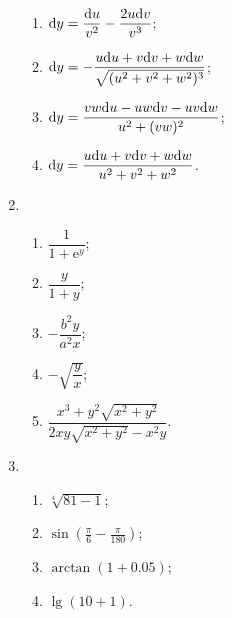 \begin{enumerate}
\begin{enumerate}[(1)]
            \item %
                $\mathrm{d} y = \dfrac{\mathrm{d} u}{v^2} - \dfrac{2u\mathrm{d} v}{v^3}$;
            \item %
                $\mathrm{d} y = -\dfrac{u\mathrm{d} u + v\mathrm{d} v + w\mathrm{d} w}{\sqrt{(u^2 + v^2 + w^2)^3}}$;
            \item %
                $\mathrm{d} y = \dfrac{vw\mathrm{d} u - uw\mathrm{d} v - uv\mathrm{d} w}{u^2 + (vw)^2}$;
            \item %
                $\mathrm{d} y = \dfrac{u\mathrm{d} u + v\mathrm{d} v + w\mathrm{d} w}{u^2 + v^2 + w^2}$.
        \end{enumerate}
    \item %
        \begin{enumerate}[(1)]
            \item %
                $\dfrac{1}{1 + \mathrm{e}^y}$;
            \item %
                $\dfrac{y}{1 + y}$;
            \item %
                $-\dfrac{b^2y}{a^2x}$;
            \item %
                $-\sqrt{\dfrac yx}$;
            \item %
                $\dfrac{x^3 + y^2\sqrt{x^2+y^2}}{2xy\sqrt{x^2+y^2} - x^2y}$.
        \end{enumerate}
    \item %
        \begin{enumerate}[(1)]
            \item %
                $\sqrt[4]{81 - 1}$;
            \item %
                $\displaystyle{
                    \sin\left(\frac{\pi}{6} - \frac{\pi}{180}\right)
                }$;
            \item %
                $\arctan(1 + 0.05)$;
            \item %
                $\lg(10 + 1)$.
        \end{enumerate}
\end{enumerate}
% 